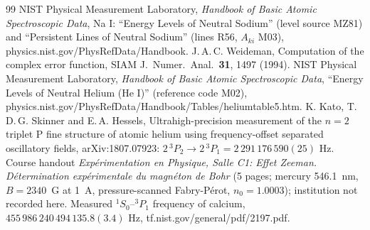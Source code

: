 \begin{thebibliography}{99}
 NIST Physical Measurement Laboratory, \emph{Handbook of Basic Atomic Spectroscopic Data}, Na I: ``Energy Levels of Neutral Sodium'' (level source MZ81) and ``Persistent Lines of Neutral Sodium'' (lines R56, $A_{ki}$ M03), physics.nist.gov/PhysRefData/Handbook.
 J.\,A.\,C. Weideman, Computation of the complex error function, SIAM J.\ Numer.\ Anal.\ \textbf{31}, 1497 (1994).
 NIST Physical Measurement Laboratory, \emph{Handbook of Basic Atomic Spectroscopic Data}, ``Energy Levels of Neutral Helium (He I)'' (reference code M02), physics.nist.gov/PhysRefData/Handbook/Tables/heliumtable5.htm.
 K. Kato, T.\,D.\,G. Skinner and E.\,A. Hessels, Ultrahigh-precision measurement of the $n=2$ triplet P fine structure of atomic helium using frequency-offset separated oscillatory fields, arXiv:1807.07923: $2\,^3P_2\to2\,^3P_1=2\,291\,176\,590(25)$ Hz.
 Course handout \emph{Exp\'erimentation en Physique, Salle C1: Effet Zeeman. D\'etermination exp\'erimentale du magn\'eton de Bohr} (5 pages; mercury 546.1~nm, $B=2340$~G at 1~A, pressure-scanned Fabry-P\'erot, $n_0=1.0003$); institution not recorded here.
 Measured $^1S_0$--$^3P_1$ frequency of calcium, $455\,986\,240\,494\,135.8(3.4)$ Hz, tf.nist.gov/general/pdf/2197.pdf.
\end{thebibliography}
